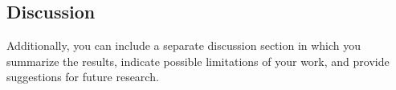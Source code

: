 \subsection{Discussion}
Additionally, you can include a separate discussion section in which you summarize the results, indicate possible limitations of your work, and provide suggestions for future research.
